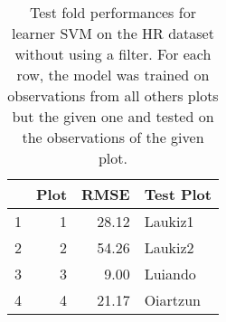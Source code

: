 \begin{table}[ht!]
\centering
\caption{Test fold performances for learner SVM on the HR dataset without using a filter. For each row, the model was trained on observations from all others plots but the given one and tested on the observations of the given plot.} 
\label{tab:svm-single-fold-perf}
\begin{tabular}{rrrl}
  \hline
 & Plot & RMSE & Test Plot \\ 
  \hline
1 &   1 & 28.12 & Laukiz1 \\ 
  2 &   2 & 54.26 & Laukiz2 \\ 
  3 &   3 & 9.00 & Luiando \\ 
  4 &   4 & 21.17 & Oiartzun \\ 
   \hline
\end{tabular}
\end{table}
